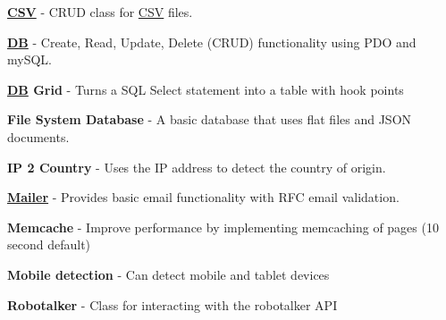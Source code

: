 \begin{DoxyItemize}
\item {\bfseries \hyperlink{class_c_s_v}{C\-S\-V}} -\/ C\-R\-U\-D class for \hyperlink{class_c_s_v}{C\-S\-V} files.
\end{DoxyItemize}


\begin{DoxyItemize}
\item {\bfseries \hyperlink{class_d_b}{D\-B}} -\/ Create, Read, Update, Delete (C\-R\-U\-D) functionality using P\-D\-O and my\-S\-Q\-L.
\end{DoxyItemize}


\begin{DoxyItemize}
\item {\bfseries \hyperlink{class_d_b}{D\-B} Grid} -\/ Turns a S\-Q\-L Select statement into a table with hook points
\end{DoxyItemize}


\begin{DoxyItemize}
\item {\bfseries File System Database} -\/ A basic database that uses flat files and J\-S\-O\-N documents.
\end{DoxyItemize}


\begin{DoxyItemize}
\item {\bfseries I\-P 2 Country} -\/ Uses the I\-P address to detect the country of origin.
\end{DoxyItemize}


\begin{DoxyItemize}
\item {\bfseries \hyperlink{class_mailer}{Mailer}} -\/ Provides basic email functionality with R\-F\-C email validation.
\end{DoxyItemize}


\begin{DoxyItemize}
\item {\bfseries Memcache} -\/ Improve performance by implementing memcaching of pages (10 second default)
\end{DoxyItemize}


\begin{DoxyItemize}
\item {\bfseries Mobile detection} -\/ Can detect mobile and tablet devices
\end{DoxyItemize}


\begin{DoxyItemize}
\item {\bfseries Robotalker} -\/ Class for interacting with the robotalker A\-P\-I
\end{DoxyItemize}



